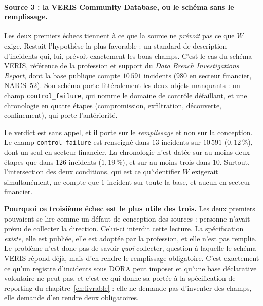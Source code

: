 \paragraph{Source 3 : la VERIS Community Database, ou le schéma sans le remplissage.}
Les deux premiers échecs tiennent à ce que la source ne \emph{prévoit} pas ce que $W$ exige.
Restait l'hypothèse la plus favorable : un standard de description d'incidents qui, lui,
prévoit exactement les bons champs. C'est le cas du schéma VERIS, référence de la
profession et support du \emph{Data Breach Investigations Report}, dont la base publique
compte $10\,591$ incidents ($980$ en secteur financier, NAICS~52). Son schéma porte
littéralement les deux objets manquants : un champ \texttt{control\_failure}, qui nomme le
domaine de contrôle défaillant, et une chronologie en quatre étapes
(compromission, exfiltration, découverte, confinement), qui porte l'antériorité.

Le verdict est sans appel, et il porte sur le \emph{remplissage} et non sur la conception.
Le champ \texttt{control\_failure} est renseigné dans $13$ incidents sur $10\,591$
($0{,}12\,\%$), dont un seul en secteur financier. La chronologie n'est datée sur au
moins deux étapes que dans $126$ incidents ($1{,}19\,\%$), et sur au moins trois dans $10$.
Surtout, l'intersection des deux conditions, qui est ce qu'identifier $W$ exigerait
simultanément, ne compte que $1$ incident sur toute la base, et aucun en
secteur financier.

\begin{cle}
\textbf{Pourquoi ce troisième échec est le plus utile des trois.} Les deux premiers pouvaient
se lire comme un défaut de conception des sources : personne n'avait prévu de collecter la
direction. Celui-ci interdit cette lecture. La spécification \emph{existe}, elle est publiée,
elle est adoptée par la profession, et elle n'est pas remplie. Le problème n'est donc
pas de savoir \emph{quoi} collecter, question à laquelle le schéma VERIS répond déjà,
mais d'en rendre le remplissage obligatoire. C'est exactement ce qu'un registre
d'incidents sous DORA peut imposer et qu'une base déclarative volontaire ne peut pas, et c'est
ce qui donne sa portée à la spécification de reporting du chapitre~\ref{ch:livrable} : elle
ne demande pas d'inventer des champs, elle demande d'en rendre deux obligatoires.
\end{cle}



